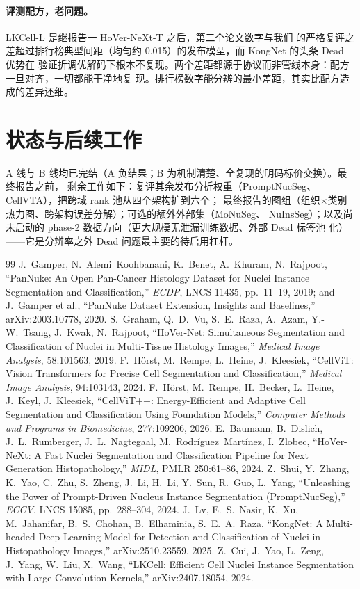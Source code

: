 \documentclass[11pt]{article}
\begin{document}
\paragraph{评测配方，老问题。}LKCell-L 是继报告一 HoVer-NeXt-T 之后，第二个论文数字与我们
的严格复评之差超过排行榜典型间距（均匀约 0.015）的发布模型，而 KongNet 的头条 Dead 优势在
验证折调优解码下根本不复现。两个差距都源于协议而非管线本身：配方一旦对齐，一切都能干净地复
现。排行榜数字能分辨的最小差距，其实比配方造成的差异还细。

\section{状态与后续工作}
\label{sec:status}

A 线与 B 线均已完结（A 负结果；B 为机制清楚、全复现的明码标价交换）。最终报告之前，
剩余工作如下：复评其余发布分折权重（PromptNucSeg、CellVTA），把跨域 rank 池从四个架构扩到六个；
最终报告的图组（组织$\times$类别热力图、跨架构误差分解）；可选的额外外部集（MoNuSeg、
NuInsSeg）；以及尚未启动的 phase-2 数据方向（更大规模无泄漏训练数据、外部 Dead 标签池
化）——它是分辨率之外 Dead 问题最主要的待启用杠杆。

\begin{thebibliography}{99}\small
{} J.~Gamper, N.~Alemi~Koohbanani, K.~Benet, A.~Khuram, N.~Rajpoot,
``PanNuke: An Open Pan-Cancer Histology Dataset for Nuclei Instance Segmentation and
Classification,'' \emph{ECDP}, LNCS 11435, pp.~11--19, 2019; and J.~Gamper et al., ``PanNuke
Dataset Extension, Insights and Baselines,'' arXiv:2003.10778, 2020.
 S.~Graham, Q.~D.~Vu, S.~E.~Raza, A.~Azam, Y.-W.~Tsang,
J.~Kwak, N.~Rajpoot, ``HoVer-Net: Simultaneous Segmentation and Classification of Nuclei in
Multi-Tissue Histology Images,'' \emph{Medical Image Analysis}, 58:101563, 2019.
 F.~H\"orst, M.~Rempe, L.~Heine, J.~Kleesiek, ``CellViT: Vision
Transformers for Precise Cell Segmentation and Classification,'' \emph{Medical Image
Analysis}, 94:103143, 2024.
 F.~H\"orst, M.~Rempe, H.~Becker, L.~Heine, J.~Keyl, J.~Kleesiek,
``CellViT++: Energy-Efficient and Adaptive Cell Segmentation and Classification Using
Foundation Models,'' \emph{Computer Methods and Programs in Biomedicine}, 277:109206, 2026.
 E.~Baumann, B.~Dislich, J.~L.~Rumberger, J.~L.~Nagtegaal,
M.~Rodr\'iguez~Mart\'inez, I.~Zlobec, ``HoVer-NeXt: A Fast Nuclei Segmentation and
Classification Pipeline for Next Generation Histopathology,'' \emph{MIDL}, PMLR 250:61--86,
2024.
 Z.~Shui, Y.~Zhang, K.~Yao, C.~Zhu, S.~Zheng, J.~Li, H.~Li, Y.~Sun,
R.~Guo, L.~Yang, ``Unleashing the Power of Prompt-Driven Nucleus Instance Segmentation
(PromptNucSeg),'' \emph{ECCV}, LNCS 15085, pp.~288--304, 2024.
 J.~Lv, E.~S.~Nasir, K.~Xu, M.~Jahanifar, B.~S.~Chohan,
B.~Elhaminia, S.~E.~A.~Raza, ``KongNet: A Multi-headed Deep Learning Model for Detection and
Classification of Nuclei in Histopathology Images,'' arXiv:2510.23559, 2025.
 Z.~Cui, J.~Yao, L.~Zeng, J.~Yang, W.~Liu, X.~Wang, ``LKCell:
Efficient Cell Nuclei Instance Segmentation with Large Convolution Kernels,''
arXiv:2407.18054, 2024.
\end{thebibliography}
\end{document}

